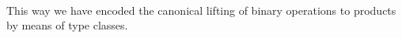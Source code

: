 \begin{isabellebody}
\isamarkuptrue%
\isamarkupfalse%
%
\isadelimproof
\ %
\endisadelimproof
%
\isatagproof
{}\isamarkupfalse%
%
\endisatagproof
{\isafoldproof}%
%
\isadelimproof
%
\endisadelimproof
\isanewline
\isanewline
{}\isamarkupfalse%
%
\begin{isamarkuptext}%
\noindent This way we have encoded the canonical lifting of
binary operations to products by means of type classes.%
\end{isamarkuptext}%
\isamarkuptrue%
%
\isadelimtheory
%
\endisadelimtheory
%
\isatagtheory
%
\endisatagtheory
{\isafoldtheory}%
%
\isadelimtheory
%
\endisadelimtheory
\end{isabellebody}%
